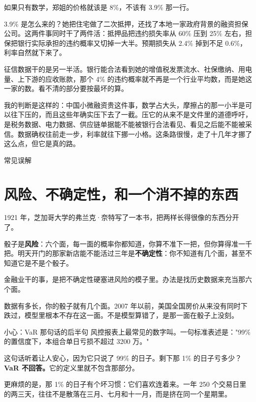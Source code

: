如果只有数学，郑姐的价格就该是 8\%，不该有 3.9\% 那一行。

3.9\% 是怎么来的？她把住宅做了二次抵押，还找了本地一家政府背景的融资担保公司。这两件事同时干了两件活：抵押品把违约损失率从 60\% 压到 25\% 左右，担保把银行实际承担的违约概率又切掉一大半。预期损失从 2.4\% 掉到不足 0.6\%，利率自然就下来了。

征信数据干的是另一半活。银行能合法看到她的增值税发票流水、社保缴纳、用电量、上下游的应收账款，那个 4\% 的违约概率就不再是一个行业平均数，而是她这一家的数。看不清的部分要按最坏的算。

我的判断是这样的：中国小微融资贵这件事，数学占大头，摩擦占的那一小半是可以往下压的，而且这些年确实压下去了一截。压它的从来不是文件里的道德呼吁，是税务数据、电力数据、供应链单据能不能被银行合法看见、看见之后能不能被采信。数据确权往前走一步，利率就往下挪一小格。这条路很慢，走了十几年才挪了这么点，但它是真的路。

\begin{mythbox}{常见误解}
\end{mythbox}

\section{风险、不确定性，和一个消不掉的东西}

1921 年，芝加哥大学的弗兰克·奈特写了一本书，把两样长得很像的东西分开了。

骰子是\textbf{风险}：六个面，每一面的概率你都知道，你算不准下一把，但你算得准一千把。明天开门的那家新店能不能活过三年是\textbf{不确定性}：你不知道有几个面，甚至不知道它是不是个骰子。

金融业干的事，是把不确定性硬塞进风险的模子里。办法是找历史数据来充当那六个面。

数据有多长，你的骰子就有几个面。2007 年以前，美国全国房价从来没有同时下跌过，模型里根本不存在这一面。不是模型算错了，是那一面在骰子上没刻。

\begin{warnbox}{小心：VaR 那句话的后半句}
风控报表上最常见的数字叫。一句标准表述是："99\% 的置信度下，本组合单日亏损不超过 3200 万。"

这句话听着让人安心，因为它只说了 99\% 的日子。剩下那 1\% 的日子亏多少？\textbf{VaR 不回答。}它的定义里就不包含那部分。

更麻烦的是，那 1\% 的日子有个坏习惯：它们喜欢连着来。一年 250 个交易日里的两三天，往往不是散落在三月、七月和十一月，而是挤在同一个星期里。

\end{warnbox}

